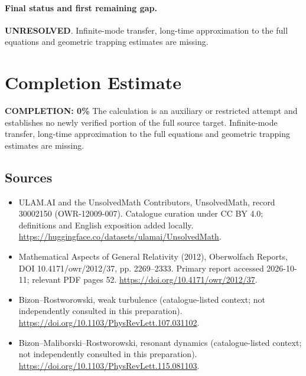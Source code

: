 \documentclass[11pt]{article}
\begin{document}
\paragraph{Final status and first remaining gap.}
\textbf{UNRESOLVED}. Infinite-mode transfer, long-time approximation to the full equations and geometric trapping estimates are missing.

\section{Completion Estimate}
\noindent\textbf{COMPLETION: 0\%}
The calculation is an auxiliary or restricted attempt and establishes no newly verified portion of the full source target. Infinite-mode transfer, long-time approximation to the full equations and geometric trapping estimates are missing.

\subsection{Sources}
\begin{itemize}
\item[\hypertarget{source:30002150:1}{S1}] ULAM.AI and the UnsolvedMath Contributors, UnsolvedMath, record 30002150 (OWR-12009-007). Catalogue curation under CC BY 4.0; definitions and English exposition added locally.
\url{https://huggingface.co/datasets/ulamai/UnsolvedMath}.
\item[\hypertarget{source:30002150:2}{S2}] Mathematical Aspects of General Relativity (2012), Oberwolfach Reports, DOI 10.4171/owr/2012/37, pp. 2269--2333. Primary report accessed 2026-10-11; relevant PDF pages 52.
\url{https://doi.org/10.4171/owr/2012/37}.
\item[\hypertarget{source:30002150:3}{S3}] Bizon--Rostworowski, weak turbulence (catalogue-listed context; not independently consulted in this preparation).
\url{https://doi.org/10.1103/PhysRevLett.107.031102}.
\item[\hypertarget{source:30002150:4}{S4}] Bizon--Maliborski--Rostworowski, resonant dynamics (catalogue-listed context; not independently consulted in this preparation).
\url{https://doi.org/10.1103/PhysRevLett.115.081103}.
\end{itemize}
\label{end:30002150}
\end{document}
